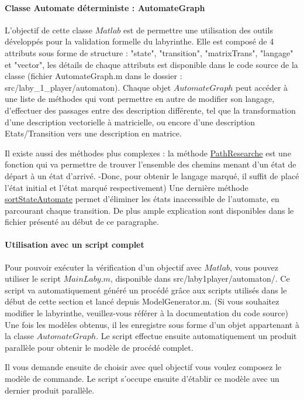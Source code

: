 \paragraph*{Classe Automate déterministe : AutomateGraph}\label{parag:AutomateGraph}
L'objectif de cette classe $Matlab$ est de permettre une utilisation des outils développés pour la validation formelle du labyrinthe. Elle est composé de 4 attributs sous forme de structure : "state", "transition", "matrixTrans", "langage" et "vector", les détails de chaque attributs est disponible dans le code source de la classe (fichier AutomateGraph.m dans le dossier : src/laby\_1\_player/automaton). Chaque objet $AutomateGraph$ peut accéder à une liste de méthodes qui vont permettre en autre de modifier son langage, d'effectuer des passages entre des description différente, tel que la transformation d'une description vectorielle à matricielle, ou encore d'une description Etats/Transition vers une description en matrice.


Il existe aussi des méthodes plus complexes : la méthode \underline{PathResearche} est une fonction qui va permettre de trouver l'ensemble des chemins menant d'un état de départ à un état d'arrivé. -Donc, pour obtenir le langage marqué, il suffit de placé l'état initial et l'état marqué respectivement) Une dernière méthode \underline{sortStateAutomate} permet d’éliminer les états inaccessible de l'automate, en parcourant chaque transition. De plus ample explication sont disponibles dans le fichier présenté au début de ce paragraphe.  



\paragraph*{Utilisation avec un script complet}
Pour pouvoir exécuter la vérification d'un objectif avec $Matlab$, vous pouvez utiliser le script $MainLaby.m$, disponible dans src/laby1player/automaton/. Ce script va automatiquement généré un procédé grâce aux scripts utilisés dans le début de cette section et lancé depuis ModelGenerator.m. (Si vous souhaitez modifier le labyrinthe, veuillez-vous référer à la documentation du code source) Une fois les modèles obtenus, il les enregistre sous forme d'un objet appartenant à la classe $AutomateGraph$. Le script effectue ensuite automatiquement un produit parallèle pour obtenir le modèle de procédé complet. 

Il vous demande ensuite de choisir avec quel objectif vous voulez composez le modèle de commande. Le script s'occupe ensuite d'établir ce modèle avec un dernier produit parallèle.  


